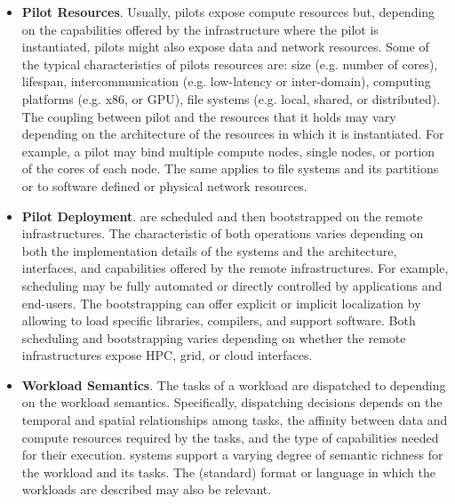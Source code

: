\documentclass{sig-alternate}
\begin{document}
\begin{itemize}

\item \textbf{Pilot Resources}. Usually, pilots expose compute resources but,
  depending on the capabilities offered by the infrastructure where the pilot
  is instantiated, pilots might also expose data and network resources. Some of
  the typical characteristics of pilots resources are: size (e.g. number of
  cores), lifespan, intercommunication (e.g. low-latency or inter-domain),
  computing platforms (e.g. x86, or GPU), file systems (e.g. local, shared, or
  distributed). The coupling between pilot and the resources that it holds may
  vary depending on the architecture of the resources in which it is
  instantiated. For example, a pilot may bind multiple compute nodes, single
  nodes, or portion of the cores of each node. The same applies to file systems
  and its partitions or to software defined or physical network resources.

\item \textbf{Pilot Deployment}. \pilots are scheduled and then bootstrapped on
  the remote infrastructures. The characteristic of both operations varies
  depending on both the implementation details of the \pilot systems and the
  architecture, interfaces, and capabilities offered by the remote
  infrastructures. For example, \pilot scheduling may be fully automated or
  directly controlled by applications and end-users. The bootstrapping can
  offer explicit or implicit localization by allowing to load specific
  libraries, compilers, and support software. Both scheduling and bootstrapping
  varies depending on whether the remote infrastructures expose HPC, grid, or
  cloud interfaces.

\item \textbf{Workload Semantics}. The tasks of a workload are dispatched to
  \pilots depending on the workload semantics. Specifically, dispatching
  decisions depends on the temporal and spatial relationships among tasks, the
  affinity between data and compute resources required by the tasks, and the
  type of capabilities needed for their execution. \pilot systems support a
  varying degree of semantic richness for the workload and its tasks. The
  (standard) format or language in which the workloads are described may also
  be relevant.


\end{itemize}
\end{document}
